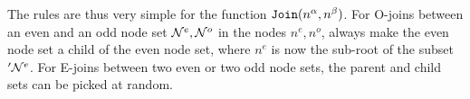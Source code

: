 %
%
%

The rules are thus very simple for the function $\texttt{Join}(n^\alpha, n^\beta)$. For O-joins between an even and an odd node set $\mathcal{N}^e, \mathcal{N}^o$ in the nodes $n^e, n^o$, always make the even node set a child of the even node set, where $n^e$ is now the sub-root of the subset $'\mathcal{N}^e$. For E-joins between two even or two odd node sets, the parent and child sets can be picked at random.

